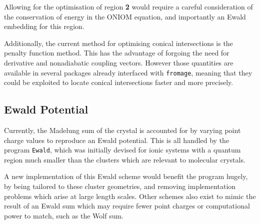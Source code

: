 Allowing for the optimisation of region \textbf{2} would require a careful consideration of the conservation of energy in the ONIOM equation, and importantly an Ewald embedding for this region.

Additionally, the current method for optimising conical intersections is the penalty function method. This has the advantage of forgoing the need for derivative and nonadiabatic coupling vectors. However those quantities are available in several packages already interfaced with \texttt{fromage}, meaning that they could be exploited to locate conical intersections faster and more precisely.

\subsection*{Ewald Potential}
Currently, the Madelung sum of the crystal is accounted for by varying point charge values to reproduce an Ewald potential. This is all handled by the program \texttt{Ewald},\cite{Klintenberg2000,Derenzo2000} which was initially devised for ionic systems with a quantum region much smaller than the clusters which are relevant to molecular crystals.

A new implementation of this Ewald scheme would benefit the program hugely, by being tailored to these cluster geometries, and removing implementation problems which arise at large length scales. Other schemes also exist to mimic the result of an Ewald sum which may require fewer point charges or computational power to match,\cite{Fukuda2012} such as the Wolf sum.\cite{Wolf1999}